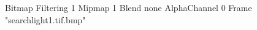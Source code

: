 {Bitmap
	{Filtering 1}
	{Mipmap 1}
	{Blend none}
	{AlphaChannel 0}
	{Frame "searchlight1.tif.bmp"}
}
